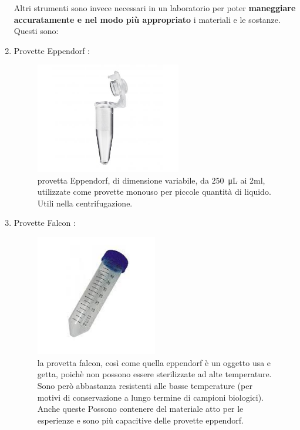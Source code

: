 \documentclass{article}
\begin{document}
\begin{enumerate}
\begin{figure}[H]
		\end{figure}

		\vspace{0.5cm}

Altri strumenti sono invece necessari in un laboratorio per poter
\textbf{maneggiare accuratamente e nel modo più appropriato} i materiali
e le sostanze. Questi sono:
		\vspace{0.5cm}

		\item Provette Eppendorf :

		\begin{figure}[H]

			\includegraphics[width=0.6\textwidth]{./immagini/eppendorf.jpg}
			\caption{provetta Eppendorf, di dimensione variabile, da \SI{250}{\micro\liter} ai 2ml,
			utilizzate come provette monouso per piccole quantità di liquido. Utili nella centrifugazione.}
			\label{eppendorf}

		\end{figure}

		\vspace{0.5cm}


		\item Provette Falcon :

		\begin{figure}[H]

			\includegraphics[width=0.5\textwidth]{./immagini/falcon.jpeg}
			\caption{la provetta falcon, così come quella eppendorf è un oggetto usa e getta, poichè non possono essere sterilizzate ad alte temperature.
			Sono però abbastanza resistenti alle basse temperature (per motivi di conservazione a lungo termine di campioni biologici). Anche queste
			Possono contenere del materiale atto per le esperienze e sono più capacitive delle provette eppendorf.}
			\label{falcon}


\end{figure}
\end{enumerate}
\end{document}
